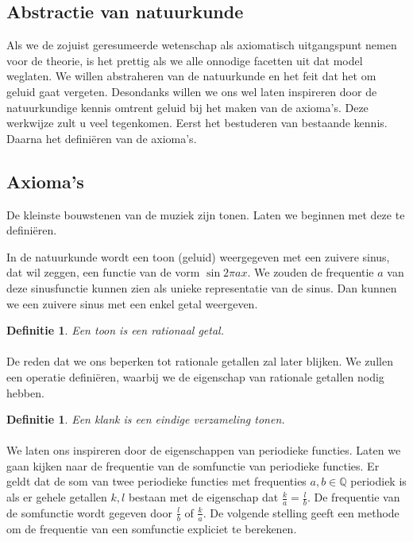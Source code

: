 \documentclass[a4paper]{article}
\newtheorem{dfn}[st]{Definitie}
\begin{document}
\subsection*{Abstractie van natuurkunde}
Als we de zojuist geresumeerde wetenschap als axiomatisch uitgangspunt nemen voor de theorie, is het prettig als we alle onnodige facetten uit dat model weglaten.
We willen abstraheren van de natuurkunde en het feit dat het om geluid gaat vergeten.
Desondanks willen we ons wel laten inspireren door de natuurkundige kennis omtrent geluid bij het maken van de axioma's.
Deze werkwijze zult u veel tegenkomen.
Eerst het bestuderen van bestaande kennis.
Daarna het defini\"eren van de axioma's.

\subsection*{Axioma's}
De kleinste bouwstenen van de muziek zijn tonen.
Laten we beginnen met deze te defini\"eren.

In de natuurkunde wordt een toon (geluid) weergegeven met een zuivere sinus, dat wil zeggen, een functie van de vorm $\sin{2\pi a x}$.
We zouden de frequentie $a$ van deze sinusfunctie kunnen zien als unieke representatie van de sinus.
Dan kunnen we een zuivere sinus met een enkel getal weergeven.

\begin{dfn}
	Een toon is een rationaal getal.
\end{dfn}

\paragraph{}
De reden dat we ons beperken tot rationale getallen zal later blijken.
We zullen een operatie defini\"eren, waarbij we de eigenschap van rationale getallen nodig hebben.

\begin{dfn}
	Een klank is een eindige verzameling tonen.
\end{dfn}

\paragraph{}
We laten ons inspireren door de eigenschappen van periodieke functies.
Laten we gaan kijken naar de frequentie van de somfunctie van periodieke functies.
Er geldt dat de som van twee periodieke functies met frequenties $a,b \in \mathbb{Q}$ periodiek is als er gehele getallen $k , l$ bestaan met de eigenschap dat $\frac{k}{a} = \frac{l}{b}$.
De frequentie van de somfunctie wordt gegeven door $\frac{l}{b}$ of $\frac{k}{a}$.
De volgende stelling geeft een methode om de frequentie van een somfunctie expliciet te berekenen.
\end{document}
